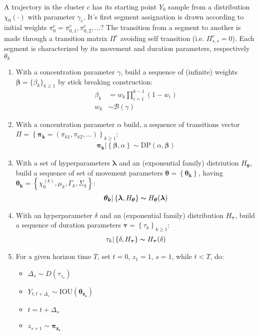\documentclass[10pt,a4paper]{article}
\newcommand{\bs}[1]{\boldsymbol{#1}}
\begin{document}
A trajectory in the cluster $c$ has its starting point $Y_0$ sample from a distribution $\chi_0(\cdot)$ with parameter $\gamma_c$. It's first segment assignation is drawn according to initial weights $\pi_0^c=  \pi_{0,1}^c, \pi_{0,2}^c,\dots$? The transition from a segment to another is made through a transition matrix $\Pi^c$ avoiding self transition (i.e. $\Pi^c_{s,s} = 0$). Each segment is characterized by its movement and duration parameters, respectively  $\theta_k$
\begin{enumerate}
\item With a concentration parameter $\gamma$, build a sequence of (infinite) weights $\bs{\beta}= \{\beta_k\}_{k\geq 1}$ by stick breaking construction:
\begin{align*}
\beta_k &= w_k\prod_{i = 1}^{k-1} (1 - w_i)\\
w_k &\sim \mathcal{B}(\gamma)
\end{align*}
\item With a concentration parameter $\alpha$ build, a sequence of transitions vector $\Pi = \left\lbrace \bs{\pi_k} = \left(\pi_{k1},\pi_{k2},\dots \right)   \right \rbrace_{k\geq 1}$:
\begin{align*}
\bs{\pi_k}\vert \left \lbrace \bs{\beta}, \alpha\right\rbrace \sim \text{DP}(\alpha, \bs{\beta})
\end{align*}
\item With a set of hyperparameters $\bs{\lambda}$ and an (exponential family) distriution $H_{\bs{\theta}}$, build a sequence of set of movement parameters $\bs{\theta} = \left\lbrace \bs{\theta_k} \right \rbrace$, having $\bs{\theta_k} = \left\lbrace\chi_0^{(k)}, \mu_k, \Gamma_k, \Sigma_k\right\rbrace$:
\begin{align*}
  \bs{\theta_k}\vert \left\lbrace \bs{\lambda}, H_{\bs{\theta}} \right\rbrace \thicksim H_ {\bs{\theta}}(\bs{\lambda})
\end{align*}
\item With an hyperparameter $\delta$ and an (exponential family) distribution $H_{\bs{\tau}}$, build a sequence of duration parameters $\bs{\tau} = \left\lbrace \tau_k \right \rbrace_{k\geq 1}$:
\begin{align*}
  \tau_k\vert \left\lbrace \delta, H_{\bs{\tau}} \right\rbrace \thicksim H_{\bs{\tau}}(\delta)
\end{align*}
\item For a given horizon time $T$, set $t = 0$, $z_1 = 1$, $s=1$, while $t < T$, do:
\begin{itemize}
\item $\Delta_s \sim D(\tau_{z_s})$
\item $Y_{t:{t + \Delta_s}} \sim \text{IOU}(\bs{\theta_{z_s}})$
\item $t = t + \Delta_s $
\item $z_{s+1} \sim \bs{\pi_{z_s}}$
\end{itemize}
\end{enumerate}
\newpage
\appendix 
\end{document}
